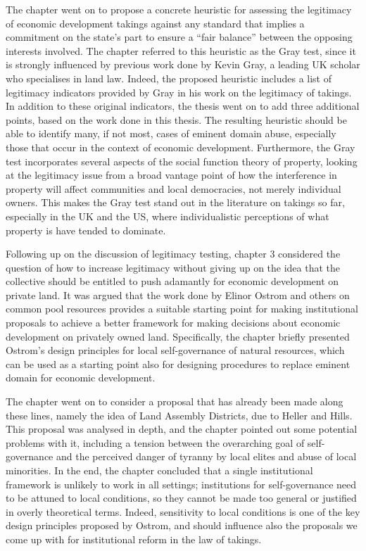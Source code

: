 The chapter went on to propose a concrete heuristic for assessing the legitimacy of economic development takings against any standard that implies a commitment on the state's part to ensure a ``fair balance'' between the opposing interests involved. The chapter referred to this heuristic as the Gray test, since it is strongly influenced by previous work done by Kevin Gray, a leading UK scholar who specialises in land law. Indeed, the proposed heuristic includes a list of legitimacy indicators provided by Gray in his work on the legitimacy of takings. In addition to these original indicators, the thesis went on to add three additional points, based on the work done in this thesis. The resulting heuristic should be able to identify many, if not most, cases of eminent domain abuse, especially those that occur in the context of economic development. Furthermore, the Gray test incorporates several aspects of the social function theory of property, looking at the legitimacy issue from a broad vantage point of how the interference in property will affect communities and local democracies, not merely individual owners. This makes the Gray test stand out in the literature on takings so far, especially in the UK and the US, where individualistic perceptions of what property is have tended to dominate.

Following up on the discussion of legitimacy testing, chapter 3 considered the question of how to increase legitimacy without giving up on the idea that the collective should be entitled to push adamantly for economic development on private land. It was argued that the work done by Elinor Ostrom and others on common pool resources provides a suitable starting point for making institutional proposals to achieve a better framework for making decisions about economic development on privately owned land. Specifically, the chapter briefly presented Ostrom's design principles for local self-governance of natural resources, which can be used as a starting point also for designing procedures to replace eminent domain for economic development.

The chapter went on to consider a proposal that has already been made along these lines, namely the idea of Land Assembly Districts, due to Heller and Hills. This proposal was analysed in depth, and the chapter pointed out some potential problems with it, including a tension between the overarching goal of self-governance and the perceived danger of tyranny by local elites and abuse of local minorities. In the end, the chapter concluded that a single institutional framework is unlikely to work in all settings; institutions for self-governance need to be attuned to local conditions, so they cannot be made too general or justified in overly theoretical terms. Indeed, sensitivity to local conditions is one of the key design principles proposed by Ostrom, and should influence also the proposals we come up with for institutional reform in the law of takings.

